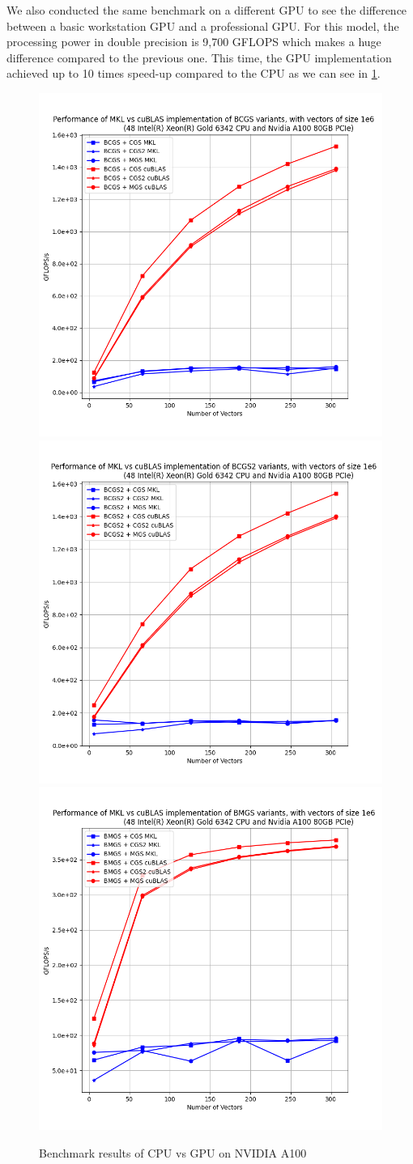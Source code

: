 We also conducted the same benchmark on a different GPU to see the difference between a basic workstation GPU and a professional GPU. For this model, the processing power in double precision is 9,700 GFLOPS which makes a huge difference compared to the previous one. This time, the GPU implementation achieved up to 10 times speed-up compared to the CPU as we can see in \ref{fig:bench_A100}.

\begin{figure}[h]
    \centering
    \includegraphics[width=0.49\linewidth]{results/orthogo_bench/flops_bench_bcgs.png}
    \includegraphics[width=0.49\linewidth]{results/orthogo_bench/flops_bench_bcgs2.png}
    \includegraphics[width=0.49\linewidth]{results/orthogo_bench/flops_bench_bmgs.png}
    \caption{Benchmark results of CPU vs GPU on NVIDIA A100}
    \label{fig:bench_A100}
\end{figure}

